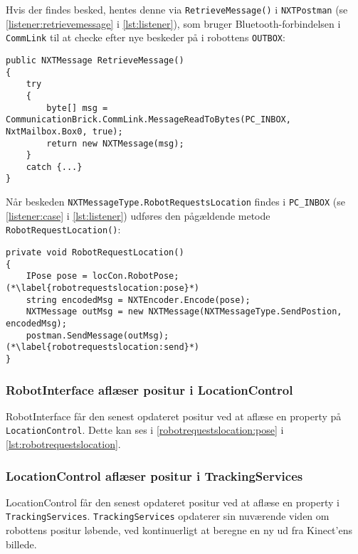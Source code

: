Hvis der findes besked, hentes denne via \lstinline[style=csharp]!RetrieveMessage()! i \lstinline[style=csharp]!NXTPostman! (se \cref{listener:retrievemessage} i \cref{lst:listener}), som bruger Bluetooth-forbindelsen i \lstinline[style=csharp]!CommLink! til at checke efter nye beskeder på i robottens \lstinline[style=c]!OUTBOX!:

\begin{lstlisting}[style=csharpsmall,label=lst:postman,caption=RetrieveMessage i NXTPostman.]
public NXTMessage RetrieveMessage()
{
    try
    {
        byte[] msg = CommunicationBrick.CommLink.MessageReadToBytes(PC_INBOX, NxtMailbox.Box0, true);
        return new NXTMessage(msg);
    }
    catch {...}
}
\end{lstlisting}

Når beskeden \lstinline[style=csharp]!NXTMessageType.RobotRequestsLocation! findes i \lstinline[style=csharp]!PC_INBOX! (se \cref{listener:case} i \cref{lst:listener}) udføres den pågældende metode \lstinline[style=csharp]!RobotRequestLocation()!:

\begin{lstlisting}[style=csharpsmall,label=lst:robotrequestslocation,caption=RobotRequestsLocation() i RobotInterface.]
private void RobotRequestLocation()
{
    IPose pose = locCon.RobotPose; (*\label{robotrequestslocation:pose}*)
    string encodedMsg = NXTEncoder.Encode(pose);
    NXTMessage outMsg = new NXTMessage(NXTMessageType.SendPostion, encodedMsg);
    postman.SendMessage(outMsg); (*\label{robotrequestslocation:send}*)
}
\end{lstlisting}

\subsubsection{RobotInterface aflæser positur i LocationControl}
RobotInterface får den senest opdateret positur ved at aflæse en property på \lstinline[style=csharp]!LocationControl!.
Dette kan ses i \cref{robotrequestslocation:pose} i \cref{lst:robotrequestslocation}.

\subsubsection{LocationControl aflæser positur i TrackingServices}
LocationControl får den senest opdateret positur ved at aflæse en property i \lstinline[style=csharp]!TrackingServices!.
\lstinline[style=csharp]!TrackingServices! opdaterer sin nuværende viden om robottens positur løbende, ved kontinuerligt at beregne en ny ud fra Kinect'ens billede.


